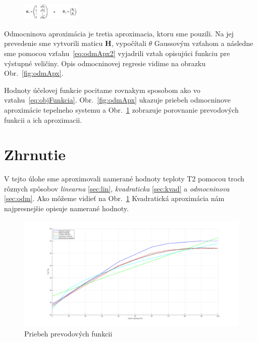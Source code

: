 \documentclass{article}
\begin{document}
\begin{figure}[!htbp]
	\begin{center}
		\includegraphics[width=0.25\textwidth]{include/defHandTheta3.png}
	\end{center}
\end{figure}

Odmocninova aproximácia je tretia aproximacia, ktoru sme pouzili.
Na jej prevedenie sme vytvorili maticu \textbf{H}, vypočítali
\(\theta\) Gaussovým vzťahom a následne sme pomocou vzťahu~\ref{eq:odmApx2}
vyjadrili vztah opisujúci funkciu pre výstupné veličiny. Opis odmocninovej
regresie vidime na obrazku Obr.~\ref{fig:odmApx}.

Hodnoty účelovej funkcie pocitame rovnakym sposobom ako vo vztahu~\ref{eq:objFunkcia}.
Obr.~\ref{fig:odmApx} ukazuje priebeh odmocninove aproximácie tepelneho systemu a
Obr.~\ref{fig:prevod} zobrazuje porovnanie prevodových funkcii a ich aproximacii.
\clearpage

\section{Zhrnutie}
\label{sec:zhrnutie}

V tejto úlohe sme aproximovali namerané hodnoty teploty T2 pomocou troch rôznych spôsobov
\textit{linearna} \ref{sec:lin}, \textit{kvadraticka} \ref{sec:kvad} a \textit{odmocninova} \ref{sec:odm}.
Ako môžeme vidieť na Obr.~\ref{fig:prevod} Kvadratická aproximácia nám najpresnejšie opisuje namerané hodnoty.

\begin{figure}[!htbp]
	\begin{center}
		\includegraphics[width=\textwidth]{./include/prevodove_funkcie2.png}
		\caption{Priebeh prevodových funkcii}
		\label{fig:prevod}
	\end{center}
	\hfill
\end{figure}
\end{document}
